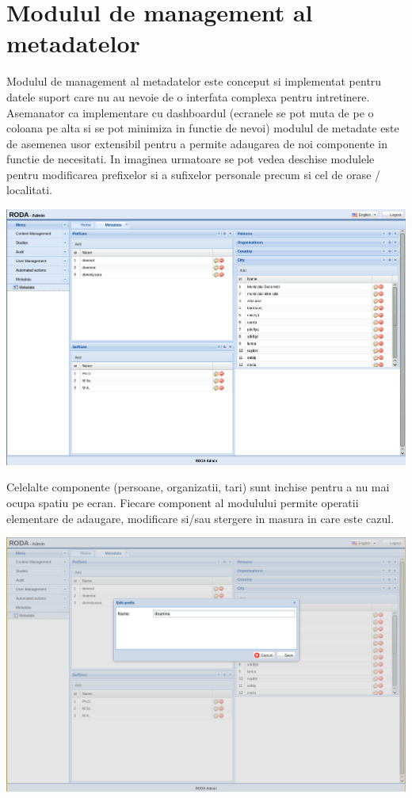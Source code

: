 \section {Modulul de management al metadatelor}

Modulul de management al metadatelor este conceput si implementat pentru datele suport care nu au nevoie de o interfata complexa pentru intretinere. Asemanator ca implementare cu dashboardul (ecranele se pot muta de pe o coloana pe alta si se pot minimiza in functie de nevoi) modulul de metadate este de asemenea usor extensibil pentru a permite adaugarea de noi componente in functie de necesitati. In imaginea urmatoare se pot vedea deschise modulele pentru modificarea prefixelor si a sufixelor personale precum si cel de orase / localitati.

\includegraphics[width=16cm]{img/metadata}

Celelalte componente (persoane, organizatii, tari) sunt inchise pentru a nu mai ocupa spatiu pe ecran. Fiecare component al modulului permite operatii elementare de adaugare, modificare si/sau stergere in masura in care este cazul.

\includegraphics[width=16cm]{img/metadata-form}


